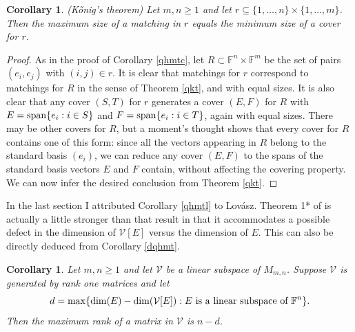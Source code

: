 \documentclass{amsart}
\newtheorem{cor}[thm]{Corollary}
\theoremstyle{definition}
\begin{document}
\begin{cor} (Kőnig's theorem)
Let $m, n \geq 1$ and let $r \subseteq \{1, \ldots, n\}\times \{1, \ldots, m\}$. Then the maximum size of a matching in $r$ equals the minimum size of a cover for $r$.
\end{cor}

\begin{proof}
As in the proof of Corollary \ref{qhmtc}, let $R \subset \mathbb{F}^n \times \mathbb{F}^m$ be the set of pairs $(e_i, e_j)$ with $(i,j) \in r$. It is clear that matchings for $r$ correspond to matchings for $R$ in the sense of Theorem \ref{qkt}, and with equal sizes. It is also clear that any cover $(S,T)$ for $r$ generates a cover $(E,F)$ for $R$ with $E = {\rm span}\{e_i: i \in S\}$ and $F = {\rm span}\{e_i: i \in T\}$, again with equal sizes. There may be other covers for $R$, but a moment's thought shows that every cover for $R$ contains one of this form: since all the vectors appearing in $R$ belong to the standard basis $(e_i)$, we can reduce any cover $(E, F)$ to the spans of the standard basis vectors $E$ and $F$ contain, without affecting the covering property. We can now infer the desired conclusion from Theorem \ref{qkt}.
\end{proof}

In the last section I attributed Corollary \ref{qhmtl} to Lovász. Theorem 1* of \cite{lovasz} is actually a little stronger than that result in that it accommodates a possible defect in the dimension of $\mathcal{V}[E]$ versus the dimension of $E$. This can also be directly deduced from Corollary \ref{dqhmt}.

\begin{cor}\label{locor} \cite[Theorem 1*]{lovasz}
Let $m, n \geq 1$ and let $\mathcal{V}$ be a linear subspace of $M_{m,n}$. Suppose $\mathcal{V}$ is generated by rank one matrices and let $$d = {\rm max}\{{\rm dim}(E) - {\rm dim}(\mathcal{V}[E]): E\mbox{ is a linear subspace of }\mathbb{F}^n\}.$$ Then the maximum rank of a matrix in $\mathcal{V}$ is $n - d$.
\end{cor}
\end{document}
